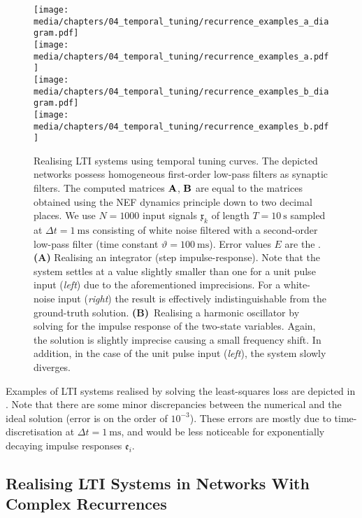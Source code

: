 \begin{figure}[p]
	\centering
	\texttt{[image: media/chapters/04\_temporal\_tuning/recurrence\_examples\_a\_diagram.pdf]}\\[0.5em]
	\texttt{[image: media/chapters/04\_temporal\_tuning/recurrence\_examples\_a.pdf]}\\[1em]
	\texttt{[image: media/chapters/04\_temporal\_tuning/recurrence\_examples\_b\_diagram.pdf]}\\[0.5em]
	\texttt{[image: media/chapters/04\_temporal\_tuning/recurrence\_examples\_b.pdf]}%
	{\label{fig:recurrence_examples_1a}}%
	{\label{fig:recurrence_examples_1b}}%
	\caption[Realising LTI systems using temporal tuning curves]{
		Realising LTI systems using temporal tuning curves.
		The depicted networks possess homogeneous first-order low-pass filters as synaptic filters.
		The computed matrices $\mathbf{A}$, $\mathbf{B}$ are equal to the matrices obtained using the NEF dynamics principle down to two decimal places.
		We use $N = 1000$ input signals $\mathfrak{x}_k$ of length $T = \SI{10}{\second}$ sampled at $\Delta t = \SI{1}{\milli\second}$ consisting of white noise filtered with a second-order low-pass filter (time constant $\vartheta = \SI{100}{\milli\second}$).
		Error values $E$ are the \NRMSE.
		\textbf{(A)} Realising an integrator (step impulse-response).
		Note that the system settles at a value slightly smaller than one for a unit pulse input (\emph{left}) due to the aforementioned imprecisions. For a white-noise input (\emph{right}) the result is effectively indistinguishable from the ground-truth solution.
		\textbf{(B)}~Realising a harmonic oscillator by solving for the impulse response of the two-state variables.
		Again, the solution is slightly imprecise causing a small frequency shift.
		In addition, in the case of the unit pulse input (\emph{left}), the system slowly diverges.
	}
	\label{fig:recurrence_examples_1}
\end{figure}

Examples of LTI systems realised by solving the least-squares loss are depicted in .
Note that there are some minor discrepancies between the numerical and the ideal solution (error is on the order of $10^{-3}$).
These errors are mostly due to time-discretisation at $\Delta t = \SI{1}{\milli\second}$, and would be less noticeable for exponentially decaying impulse responses $\mathfrak{e}_i$.

\newpage

\subsection{Realising LTI Systems in Networks With Complex Recurrences}
\label{sec:lti_complex_networks}

